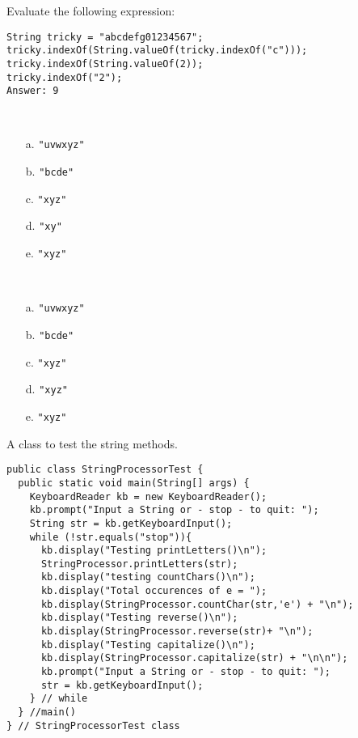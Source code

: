 \begin{ANS}
\item  Evaluate the following expression:

\begin{jjjlisting}
\begin{lstlisting}
String tricky = "abcdefg01234567";
tricky.indexOf(String.valueOf(tricky.indexOf("c")));
tricky.indexOf(String.valueOf(2));
tricky.indexOf("2");
Answer: 9
\end{lstlisting}
\end{jjjlisting}


\begin{multicols}{4}
\item\mbox{ }

\begin{enumerate}
\item[a.]  \verb|"uvwxyz"|
\item[b.]  \verb|"bcde"|    
\item[c.]  \verb|"xyz"| 
\item[d.]  \verb|"xy"|
\item[e.]  \verb|"xyz"|
\end{enumerate}
\end{multicols}



\begin{multicols}{4}
\item\mbox{ }

\begin{enumerate}
\item[a.]  \verb|"uvwxyz"|
\item[b.]  \verb|"bcde"|
\item[c.]  \verb|"xyz"|
\item[d.]  \verb|"xyz"|
\item[e.]  \verb|"xyz"|
\end{enumerate}
\end{multicols}



\item  A class to test the string methods.

\begin{jjjlisting}[27pc]
\begin{lstlisting}
public class StringProcessorTest {
  public static void main(String[] args) {
    KeyboardReader kb = new KeyboardReader();
    kb.prompt("Input a String or - stop - to quit: ");
    String str = kb.getKeyboardInput();
    while (!str.equals("stop")){
      kb.display("Testing printLetters()\n");
      StringProcessor.printLetters(str);
      kb.display("testing countChars()\n");
      kb.display("Total occurences of e = ");
      kb.display(StringProcessor.countChar(str,'e') + "\n");
      kb.display("Testing reverse()\n");
      kb.display(StringProcessor.reverse(str)+ "\n");
      kb.display("Testing capitalize()\n");
      kb.display(StringProcessor.capitalize(str) + "\n\n");
      kb.prompt("Input a String or - stop - to quit: ");
      str = kb.getKeyboardInput();
    } // while
  } //main()
} // StringProcessorTest class
\end{lstlisting}
\end{jjjlisting}


\end{ANS}
